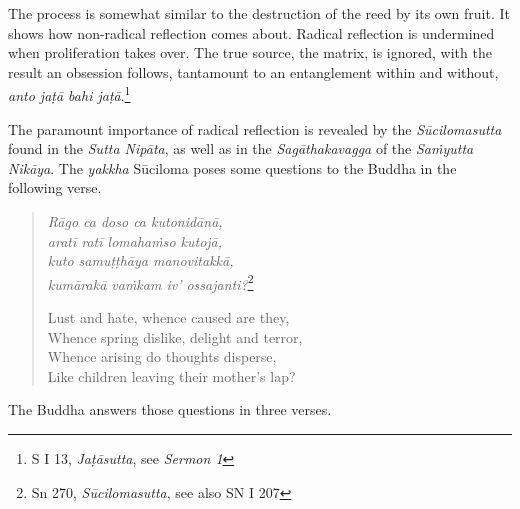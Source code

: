 The process is somewhat similar to the destruction of the reed by its own fruit. It shows how non-radical reflection comes about. Radical reflection is undermined when proliferation takes over. The true source, the matrix, is ignored, with the result an obsession follows, tantamount to an entanglement within and without, \emph{anto jaṭā bahi jaṭā}.\footnote{S I 13, \emph{Jaṭāsutta}, see \emph{Sermon 1}}

The paramount importance of radical reflection is revealed by the \emph{Sūcilomasutta} found in the \emph{Sutta Nipāta}, as well as in the \emph{Sagāthakavagga} of the \emph{Saṁyutta Nikāya}. The \emph{yakkha} Sūciloma poses some questions to the Buddha in the following verse.

\begin{quote}
\emph{Rāgo ca doso ca kutonidānā,}\\
\emph{aratī ratī lomahaṁso kutojā,}\\
\emph{kuto samuṭṭhāya manovitakkā,}\\
\emph{kumārakā vaṁkam iv' ossajanti?}\footnote{Sn 270, \emph{Sūcilomasutta}, see also SN I 207}

Lust and hate, whence caused are they,\\
Whence spring dislike, delight and terror,\\
Whence arising do thoughts disperse,\\
Like children leaving their mother's lap?
\end{quote}

The Buddha answers those questions in three verses.

